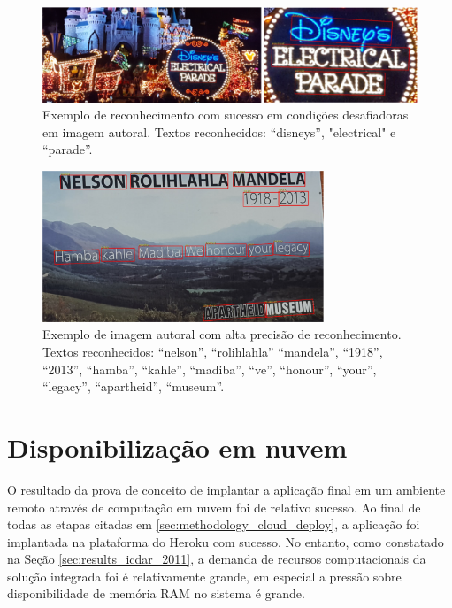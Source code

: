 \begin{figure}
    \centering
    \includegraphics[width=\textwidth]{figs/resultados-autoral-04.png}
    \caption{Exemplo de reconhecimento com sucesso em condições desafiadoras em imagem autoral. Textos reconhecidos: “disneys”, 
    "electrical" e “parade”.}
    \label{fig:results_own_images_04}
\end{figure}

\begin{figure}
    \centering
    \includegraphics[width=0.75\textwidth]{figs/resultados-autoral-05.png}
    \caption{Exemplo de imagem autoral com alta precisão de reconhecimento. Textos reconhecidos: “nelson”, “rolihlahla” “mandela”, 
    “1918”, “2013”, “hamba”, “kahle”, “madiba”, “ve”, “honour”, “your”, “legacy”, “apartheid”, “museum”.}
    \label{fig:results_own_images_05}
\end{figure}


\section{Disponibilização em nuvem}
O resultado da prova de conceito de implantar a aplicação final em um ambiente remoto através de computação em nuvem foi de relativo 
sucesso. Ao final de todas as etapas citadas em \ref{sec:methodology_cloud_deploy}, a aplicação foi implantada na plataforma do 
Heroku com sucesso. No entanto, como constatado na Seção \ref{sec:results_icdar_2011}, a demanda de recursos computacionais da 
solução integrada foi é relativamente grande, em especial a pressão sobre disponibilidade de memória RAM no sistema é grande.

